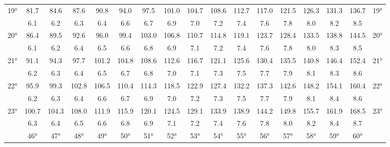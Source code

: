 \begin{scriptsize}
\begin{tabular}{c || c | c | c | c | c | c | c | c | c | c | c | c | c | c | c || c}
		\multirow{2}{*}{19°}&81.7&84.6&87.6&90.8&94.0&97.5&101.0&104.7&108.6&112.7&117.0&121.5&126.3&131.3&136.7&\multirow{2}{*}{19°}\\ \space&6.1&6.2&6.3&6.4&6.6&6.7&6.9&7.0&7.2&7.4&7.6&7.8&8.0&8.2&8.5&\space\\\hline
		\multirow{2}{*}{20°}&86.4&89.5&92.6&96.0&99.4&103.0&106.8&110.7&114.8&119.1&123.7&128.4&133.5&138.8&144.5&\multirow{2}{*}{20°}\\ \space&6.1&6.2&6.4&6.5&6.6&6.8&6.9&7.1&7.2&7.4&7.6&7.8&8.0&8.3&8.5&\space\\\hline
		\multirow{2}{*}{21°}&91.1&94.3&97.7&101.2&104.8&108.6&112.6&116.7&121.1&125.6&130.4&135.5&140.8&146.4&152.4&\multirow{2}{*}{21°}\\ \space&6.2&6.3&6.4&6.5&6.7&6.8&7.0&7.1&7.3&7.5&7.7&7.9&8.1&8.3&8.6&\space\\\hline
		\multirow{2}{*}{22°}&95.9&99.3&102.8&106.5&110.4&114.3&118.5&122.9&127.4&132.2&137.3&142.6&148.2&154.1&160.4&\multirow{2}{*}{22°}\\ \space&6.2&6.3&6.4&6.6&6.7&6.9&7.0&7.2&7.3&7.5&7.7&7.9&8.1&8.4&8.6&\space\\\hline
		\multirow{2}{*}{23°}&100.7&104.3&108.0&111.9&115.9&120.1&124.5&129.1&133.9&138.9&144.2&149.8&155.7&161.9&168.5&\multirow{2}{*}{23°}\\ \space&6.3&6.4&6.5&6.6&6.8&6.9&7.1&7.2&7.4&7.6&7.8&8.0&8.2&8.4&8.7&\space\\\hline
		\hline\space &46°&47°&48°&49°&50°&51°&52°&53°&54°&55°&56°&57°&58°&59°&60°
\end{tabular}\end{scriptsize}

